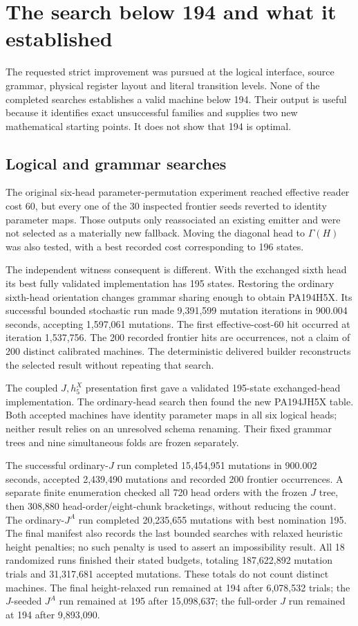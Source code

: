 \section{The search below 194 and what it established}
\label{sec:search}

The requested strict improvement was pursued at the logical interface,
source grammar, physical register layout and literal transition levels.
None of the completed searches establishes a valid machine below 194.
Their output is useful because it identifies exact unsuccessful families
and supplies two new mathematical starting points.  It does not show
that 194 is optimal.

\subsection{Logical and grammar searches}

The original six-head parameter-permutation experiment reached effective
reader cost 60, but every one of the 30 inspected frontier seeds reverted
to identity parameter maps.  Those outputs only reassociated an existing
emitter and were not selected as a materially new fallback.  Moving the
diagonal head to $\Gamma(H)$ was also tested, with a best recorded cost
corresponding to 196 states.

The independent witness consequent is different.  With the exchanged
sixth head its best fully validated implementation has 195 states.
Restoring the ordinary sixth-head orientation changes grammar sharing
enough to obtain PA194H5X.  Its successful bounded stochastic run made
9,391,599 mutation iterations in 900.004 seconds, accepting 1,597,061
mutations.  The first effective-cost-60 hit occurred at iteration
1,537,756.  The 200 recorded frontier hits are occurrences, not a claim
of 200 distinct calibrated machines.  The deterministic delivered
builder reconstructs the selected result without repeating that search.

The coupled $J,h_5^X$ presentation first gave a validated 195-state
exchanged-head implementation.  The ordinary-head search then found the
new PA194JH5X table.  Both accepted machines have identity parameter maps
in all six logical heads; neither result relies on an unresolved schema
renaming.  Their fixed grammar trees and nine simultaneous folds are
frozen separately.

The successful ordinary-$J$ run completed 15,454,951 mutations in
900.002 seconds, accepted 2,439,490 mutations and recorded 200 frontier
occurrences.  A separate finite enumeration checked all 720 head orders
with the frozen $J$ tree, then 308,880 head-order/eight-chunk bracketings,
without reducing the count.  The ordinary-$J^A$ run completed 20,235,655
mutations with best nomination 195.  The final manifest also records
the last bounded searches with relaxed heuristic height penalties; no
such penalty is used to assert an impossibility result.  All 18 randomized
runs finished their stated budgets, totaling 187,622,892 mutation trials
and 31,317,681 accepted mutations.  These totals do not count distinct
machines.  The final height-relaxed run remained at 194 after 6,078,532
trials; the $J$-seeded $J^A$ run remained at 195 after 15,098,637; the
full-order $J$ run remained at 194 after 9,893,090.


